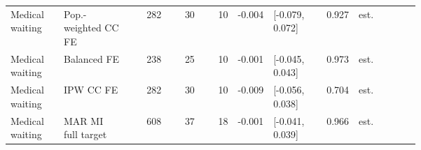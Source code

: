 \begin{longtable}{@{}p{0.13\linewidth}p{0.16\linewidth}rrrp{0.055\linewidth}p{0.135\linewidth}p{0.055\linewidth}p{0.15\linewidth}@{}}
Medical waiting & Pop.-weighted CC FE & 282 & 30 & 10 & -0.004 & [-0.079, 0.072] & 0.927 & est. \\
Medical waiting & Balanced FE & 238 & 25 & 10 & -0.001 & [-0.045, 0.043] & 0.973 & est. \\
Medical waiting & IPW CC FE & 282 & 30 & 10 & -0.009 & [-0.056, 0.038] & 0.704 & est. \\
Medical waiting & MAR MI full target & 608 & 37 & 18 & -0.001 & [-0.041, 0.039] & 0.966 & est. \\
\end{longtable}
\endgroup
